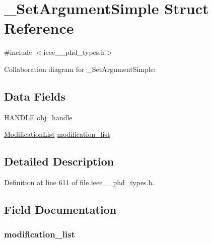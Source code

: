 \hypertarget{struct___set_argument_simple}{}\section{\+\_\+\+Set\+Argument\+Simple Struct Reference}
\label{struct___set_argument_simple}


{\ttfamily \#include $<$ieee\+\_\+\_\+phd\+\_\+types.\+h$>$}



Collaboration diagram for \+\_\+\+Set\+Argument\+Simple\+:
\subsection*{Data Fields}
\begin{DoxyCompactItemize}
\item 
\hyperlink{ieee__11073__phd__types_8h_a76f0d44d294babf2e568f7ee676ffca6}{H\+A\+N\+D\+L\+E} \hyperlink{struct___set_argument_simple_abbfff52b7a4956021522f5750c4b32c6}{obj\+\_\+handle}
\item 
\hyperlink{ieee__11073__phd__types_8h_a6b608652f686d9a267775f4354c88d26}{Modification\+List} \hyperlink{struct___set_argument_simple_ac0112bf6c06f28b7265fad525e0814ff}{modification\+\_\+list}
\end{DoxyCompactItemize}


\subsection{Detailed Description}


Definition at line 611 of file ieee\+\_\+\_\+phd\+\_\+types.\+h.



\subsection{Field Documentation}
\hypertarget{struct___set_argument_simple_ac0112bf6c06f28b7265fad525e0814ff}{}
\subsubsection[{modification\+\_\+list}]{ modification\+\_\+list}\label{struct___set_argument_simple_ac0112bf6c06f28b7265fad525e0814ff}


